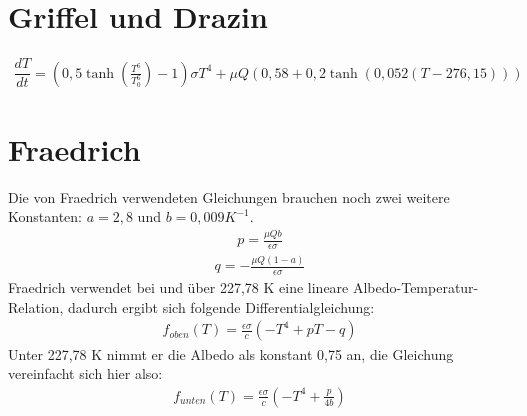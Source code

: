 \documentclass[]{report}
\begin{document}
\section{Griffel und Drazin}
	\begin{align}
		\dfrac{dT}{dt} = (0,5 \tanh\left(\frac{T^6}{T_0^6}\right)-1) \sigma T^4 + \mu Q (0,58 + 0,2 \tanh (0,052 (T - 276,15)))
	\end{align}
\section{Fraedrich}

Die von Fraedrich verwendeten Gleichungen brauchen noch zwei weitere Konstanten: $a=2,8$ und $b=0,009 K^{-1}$.
	\begin{align}
		p=\frac{\mu Q b}{\epsilon \sigma}
	\end{align}
	\begin{align}
		q = - \frac{\mu Q (1-a)}{\epsilon \sigma}
	\end{align}
	Fraedrich verwendet bei und über 227,78 K eine lineare Albedo-Temperatur-Relation, dadurch ergibt sich folgende Differentialgleichung:
	\begin{align}
		f_{oben}(T) = \frac{\epsilon \sigma}{c} (-T^4 + p T - q)
	\end{align}
	Unter 227,78 K nimmt er die Albedo als konstant 0,75 an, die Gleichung vereinfacht sich hier also:
	\begin{align}
		f_{unten}(T) = \frac{\epsilon \sigma}{c} (-T^4 + \frac{p}{4b})
	\end{align}
\end{document}
